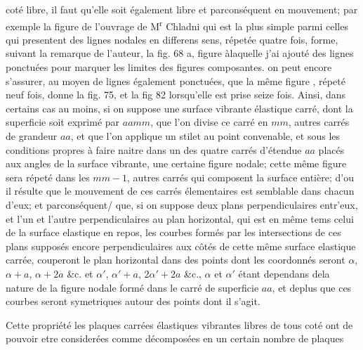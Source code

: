 \documentclass[11pt,a4paper]{article}
\begin{document}
coté libre, il faut qu'elle soit également libre et parconséquent en mouvement;
par exemple la figure  de l'ouvrage de M\textsuperscript{r} Chladni qui est la plus simple
parmi celles qui presentent des lignes nodales en differens sens, répetée quatre
fois, forme, suivant la remarque de l'auteur, la fig. 68 a, figure àlaquelle
j'ai ajouté des lignes ponctuées pour marquer les limites des figures composantes.
on peut encore s'assurer, au moyen de lignes également ponctuées, que la même
figure , répeté neuf fois, donne la fig. 75, et la fig 82 lorsqu'elle est
prise seize fois. Ainsi, dans certains cas au moins, si on suppose une surface
vibrante élastique carré, dont la superficie soit exprimé par $aamm$, que l'on
divise ce carré en $mm$, autres carrés de grandeur $aa$, et que l'on applique
un stilet au point convenable, et sous les conditions propres à faire naitre dans
un des quatre carrés d'étendue $aa$ placés aux angles de la surface vibrante,
une certaine figure nodale; cette même figure sera répeté dans les $mm-1$,
autres carrés qui composent la surface entière; d'ou il résulte que le mouvement
de ces carrés élementaires est semblable dans chacun d'eux; et parconséquent/
que, si on suppose deux plans perpendiculaires entr'eux, et l'un et l'autre
perpendiculaires au plan horizontal, qui est en même tems celui de la surface
elastique en repos, les courbes formés par les intersections de ces plans supposés
encore perpendiculaires aux côtés de cette même surface elastique carrée, couperont
le plan horizontal dans des points dont les coordonnés seront $\alpha$, $\alpha + a$,
$\alpha + 2a$ \&c. et $\alpha'$, $\alpha' + a$, $2\alpha' + 2a$ \&c., $\alpha$ et $\alpha'$ étant dependans dela
nature de la figure nodale formé dans le carré de superficie $aa$, et deplus
que ces courbes seront symetriques autour des points dont il s'agit.

Cette propriété  les plaques carrées élastiques vibrantes libres de tous coté ont de
pouvoir etre considerées comme décomposées en un certain nombre de plaques
\end{document}
